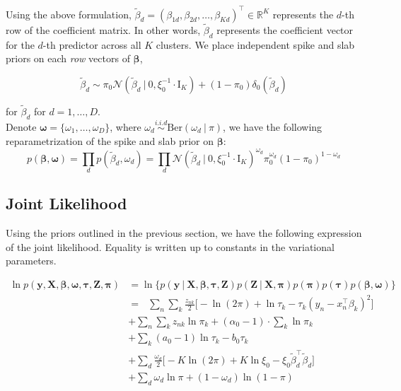 \documentclass[twoside,11pt]{article}
\newcommand\given[1][]{\:#1\vert\:}
\newcommand{\transpose}[1]{#1^{\intercal}}
\newcommand{\R}{\mathbb{R}}
\newcommand{\nsum}{\sum\limits_{n}}
\newcommand{\ksum}{\sum\limits_{k}}
\newcommand{\boldbeta}{\boldsymbol\beta}
\newcommand{\boldtau}{\boldsymbol\tau}
\newcommand{\boldpi}{\boldsymbol\pi}
\newcommand{\iid}{\overset{i.i.d}{\sim}}
\newcommand{\betad}{\tilde{\beta}_d}
\newcommand{\priorbeta}{\mathcal{N} \left( \betad \given 0, \xi_0^{-1} \cdot \mathrm{I}_K \right)}
\newcommand{\pr}[1]{p \left( #1 \right)}
\begin{document}
Using the above formulation, $\betad = \transpose{\left( \beta_{1d}, \beta_{2d}, \ldots, \beta_{Kd}\right)} \in \R^K$ represents the $d$-th row of the coefficient matrix. In other words, $\betad$ represents the coefficient vector for the $d$-th predictor across all $K$ clusters. We place independent spike and slab priors on each \textit{row} vectors of $\boldbeta$, 

\begin{equation} 
	\betad \sim \pi_0 \priorbeta + (1 - \pi_0) \delta_0 (\betad)
\end{equation}

for $\betad$ for $d = 1, \ldots, D$. \\

Denote $\boldsymbol \omega = \{ \omega_1, \ldots, \omega_D\}$, where $\omega_d \iid \mathrm{Ber}(\omega_d \given \pi)$, we have the following reparametrization of the spike and slab prior on $\boldbeta$:
\begin{equation} \label{eq:beta_joint_prior_vs_indep}
	\pr{\boldbeta, \boldsymbol\omega} = \prod_{d} \pr{\betad, \omega_d} = \prod_{d} \priorbeta^{\omega_d} \pi_0^{\omega_d} (1-\pi_0)^{1 - \omega_d}
\end{equation}


\subsection{Joint Likelihood}
Using the priors outlined in the previous section, we have the following expression of the joint likelihood. Equality is written up to constants in the variational parameters. 

\begin{equation} \label{eq:joint_vs_indep}
\begin{split}
	\ln  \pr{\mathbf{y}, \mathbf{X}, \boldbeta, \boldsymbol\omega, \boldtau, \mathbf{Z}, \boldsymbol \pi} &= 
	\ln \bigg\{\pr{\mathbf{y} \given \mathbf{X}, \boldsymbol\beta, \boldsymbol{\tau}, \mathbf{Z}}\pr{\mathbf{Z}\given \mathbf{X}, \boldpi} \pr{\boldpi} \pr{\boldtau} \pr{\boldbeta, \boldsymbol\omega} \bigg\} \\
	& = \textrm{ } \nsum \ksum \frac{z_{nk}}{2} \bigg[ -\ln(2\pi) + \ln \tau_k - \tau_k\left( y_n - \transpose{x_n}\beta_k\right)^2 \bigg] \\
	& + \nsum \ksum z_{nk} \ln \pi_k + (\alpha_0 - 1) \cdot \ksum \ln \pi_k \\
	& + \ksum (a_0 - 1) \ln \tau_k - b_0 \tau_k  \\
	& + \sum_{d} \frac{\omega_d}{2} \bigg[ -K \ln(2\pi) + K \ln \xi_0 - \xi_0 \transpose{\betad} \betad\bigg] \\ & +  \sum_{d} \omega_d \ln \pi + ( 1- \omega_d) \ln(1 - \pi)
\end{split}
\end{equation}
\end{document}
